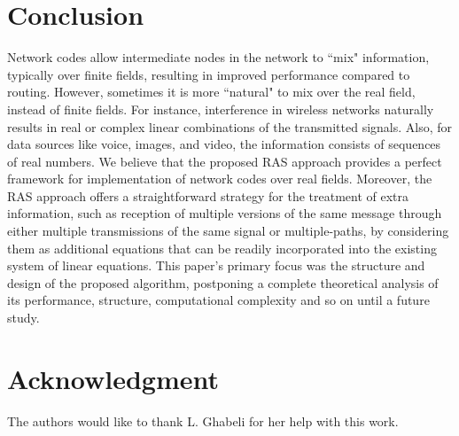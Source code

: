 \documentclass[conference]{IEEEtran}
\begin{document}
\section{Conclusion}\label{sec:conc}
Network codes allow intermediate nodes in the network to ``mix" information, typically over finite fields, resulting in improved performance compared to routing. However, sometimes it is more ``natural" to mix over the real field, instead of finite fields. For instance, interference in wireless networks naturally results in real or complex linear combinations of the transmitted signals. Also, for data sources like voice, images, and video, the information consists of sequences of real numbers. We believe that the proposed RAS approach provides a perfect framework for implementation of network codes over real fields. Moreover, the RAS approach offers a straightforward strategy for the treatment of extra information, such as reception of multiple versions of the same message through either multiple transmissions of the same signal or multiple-paths, by considering them as additional equations that can be readily incorporated into the existing system of linear equations. This paper's primary focus was the structure and design of the proposed algorithm, postponing a complete theoretical analysis of its performance, structure, computational complexity and so on until a future study.

\section*{Acknowledgment}
The authors would like to thank L. Ghabeli for her help with this work.
\nocite{*}


\end{document}
